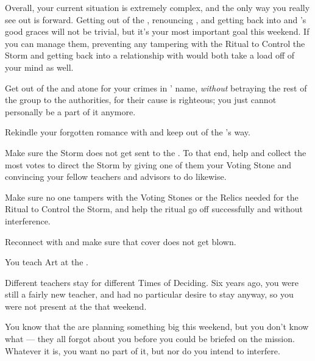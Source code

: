 \documentclass[char]{GL2020}
\begin{document}
Overall, your current situation is extremely complex, and the only way you really see out is forward. Getting out of the \pGoaties{}, renouncing \cGenesis{}, and getting back into \cEbb{} and \cFlow{}'s good graces will not be trivial, but it's your most important goal this weekend. If you can manage them, preventing any tampering with the Ritual to Control the Storm and getting back into a relationship with \cHeadScientist{} would both take a load off of your mind as well.

\begin{itemz}
    \item Get out of the \pGoaties{} and atone for your crimes in \cGenesis{}' name, \emph{without} betraying the rest of the group to the authorities, for their cause is righteous; you just cannot personally be a part of it anymore.
    \item Rekindle your forgotten romance with \cHeadScientist{} and keep \cHeadScientist{\them} out of the \pGoaties{}'s way.
    \item Make sure the Storm does not get sent to the \pShip{}. To that end, help \cInitiate{} and \cPirateChild{} collect the most votes to direct the Storm by giving one of them your Voting Stone and convincing your fellow teachers and advisors to do likewise.
    \item Make sure no one tampers with the Voting Stones or the Relics needed for the Ritual to Control the Storm, and help the ritual go off successfully and without interference.
    \item Reconnect with \cAssistantScientist{} and make sure that \cAssistantScientist{\their} cover does not get blown. 
\end{itemz}

\begin{itemz}[Notes]
    \item You teach Art at the \pSchool{}.
    \item Different teachers stay for different Times of Deciding. Six years ago, you were still a fairly new teacher, and had no particular desire to stay anyway, so you were not present at the \pSc{} that weekend.
    \item You know that the \pGoaties{} are planning something big this weekend, but you don't know what — they all forgot about you before you could be briefed on the mission. Whatever it is, you want no part of it, but nor do you intend to interfere.
\end{itemz}
\end{document}
